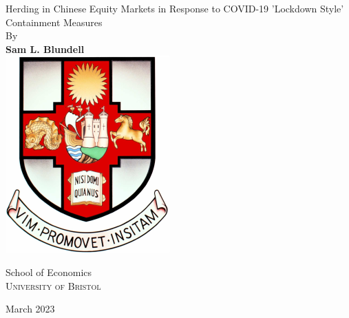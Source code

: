 \begin{titlepage}
    \begin{center}
        \vspace*{1cm}
        {\huge
        Herding in Chinese Equity Markets in Response to COVID-19
’Lockdown Style’ Containment Measures}
        \vspace{0.5cm}
        \\
        {\large By}
        \\
        \vspace{0.5cm}
        \textbf{Sam L. Blundell}
   		\vspace{1.5cm}
        \\
        \vspace{1.5cm}
       \includegraphics[scale=1]{bristolcrest_colour.pdf}
    
        \vspace{10mm}
        \large{School of Economics}
        \\
        \textsc{University of Bristol}

        \vspace{0.8cm}

        \large{March 2023}
        
    \end{center}
    
 

\end{titlepage}